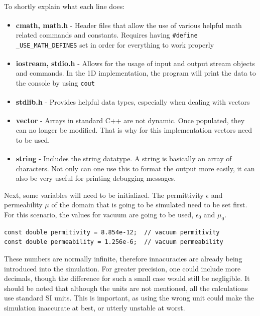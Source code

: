 To shortly explain what each line does:

\begin{itemize}
	\item \textbf{cmath, math.h}\textsuperscript{\cite{cmath}} - Header files that allow the use of various helpful math related commands and constants. Requires having \space \verb!#define _USE_MATH_DEFINES! set in order for everything to work properly
	\item \textbf{iostream, stdio.h}\textsuperscript{\cite{iostream}} - Allows for the usage of input and output stream objects and commands. In the 1D implementation, the program will print the data to the console by using \verb!cout!
	\item \textbf{stdlib.h}\textsuperscript{\cite{cstdlib}} - Provides helpful data types, especially when dealing with vectors
	\item \textbf{vector}\textsuperscript{\cite{vector}} - Arrays in standard C++ are not dynamic. Once populated, they can no longer be modified. That is why for this implementation vectors need to be used.
	\item \textbf{string}\textsuperscript{\cite{string}} - Includes the string datatype. A string is basically an array of characters. Not only can one use this to format the output more easily, it can also be very useful for printing debugging messages.
\end{itemize}

Next, some variables will need to be initialized. The permittivity $\epsilon$ and permeability $\mu$ of the domain that is going to be simulated need to be set first. For this scenario, the values for vacuum are going to be used, $\epsilon_{0}$ and $\mu_{0}$.

\begin{verbatim}
const double permitivity = 8.854e-12;  // vacuum permitivity
const double permeability = 1.256e-6;  // vacuum permeability
\end{verbatim}

These numbers are normally infinite, therefore innacuracies are already being introduced into the simulation. For greater precision, one could include more decimals, though the difference for such a small case would still be negligible. It should be noted that although the units are not mentioned, all the calculations use standard SI units. This is important, as using the wrong unit could make the simulation inaccurate at best, or utterly unstable at worst.

